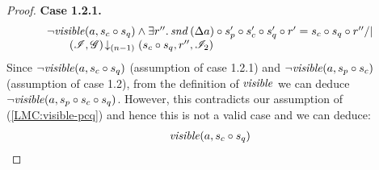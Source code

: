 \begin{lemma}
\begin{proof}
\noindent\textbf{Case 1.2.1.} 
\[
\begin{array}{l}
	\neg\m{visible}(a, s_c \composeL s_q) \land  \exsts{r''} \snd{\updateFP{a}} \composeL s_p' \composeL s_c' \composeL s_q' \composeL r' = s_c \composeL s_q \composeL r'' /| \null \\
	\qquad\extendsAMUpto{\lmod, \gmod}{(n-1)}{s_c \composeL s_q}{r''}{\lmod_2}
\end{array}
\]
Since $\neg\mathit{visible}(a, s_c \circ s_q)$ (assumption of case 1.2.1) and $\neg\mathit{visible}(a, s_p \circ s_c)$ (assumption of case 1.2), from the definition of $\mathit{visible}$ we can deduce $\neg\mathit{visible}(a, s_p \circ s_c \circ s_q)$. However, this contradicts our assumption of (\ref{LMC:visible-pcq}) and hence this is not a valid case and we can deduce:
\begin{align}
	\mathit{visible}(a, s_c \circ s_q) \label{LMC:visible-cq}
\end{align}
%
%
%
%
%


\end{proof}
\end{lemma}
